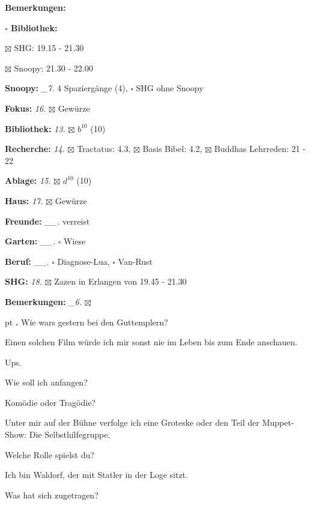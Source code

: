 \documentclass[10pt,a4paper]{article}
\newcounter{notec}
\newcommand\notep[1]{%
  \stepcounter{notec}
  \vskip #1pt
  {\bf\arabic{notec}.}
}
\newcommand\prop[1] {{\color {alizarin} {\bf #1}}}        %
\newcommand\mand[1] {{\color {burntorange} {\bf #1}}}     %
\newcommand\bottomspace{\vskip 4pt}
\newcommand\n[1] { {\sl #1.} \hskip 5pt }
\begin{document}
\begin{mdframed}[style=daystyle]
\begin{labeling}{{\mand {Bemerkungen:}}}
\begin{minipage}{0.75\textwidth}
\begin{labeling}{\prop {$\square$ {Bibliothek:}}}
      \item[$\boxtimes$ SHG:]        19.15 - 21.30
      \item[$\boxtimes$ Snoopy:]     21.30 - 22.00
      \end{labeling}
    \end{minipage}
    \bottomspace
  \item[{\mand {Snoopy:}}]        \n{\_7} 4 Spaziergänge (4), $\square$ SHG ohne Snoopy
  \item[{\mand {Fokus:}}]          \n{16} $\boxtimes$ Gewürze
  \item[{\mand {Bibliothek:}}]     \n{13} $\boxtimes$ $b^{10}$ (10)
  \item[{\mand {Recherche:}}]      \n{14} $\boxtimes$ Tractatus: 4.3, $\boxtimes$ Basis Bibel: 4.2,
      $\boxtimes$ Buddhas Lehrreden: 21 - 22
  \item[{\mand {Ablage:}}]         \n{15} $\boxtimes$ $d^{10}$ (10)
  \item[{\mand {Haus:}}]           \n{17} $\boxtimes$ Gewürze
  \item[{\mand {Freunde:}}]      \n{\_\_} verreist
  \item[{\mand {Garten:}}]       \n{\_\_} $\square$ Wiese
  \item[{\mand {Beruf:}}]        \n{\_\_} $\square$ Diagnose-Lua, $\square$ Van-Rust
  \item[{\mand {SHG:}}]            \n{18} $\boxtimes$ Zazen in Erlangen von 19.45 - 21.30
  \item[{\mand {Bemerkungen:}}]   \n{\_6} $\boxtimes$
  \end{labeling}
    
  \setcounter{notec}{0}
  
  \notep 0 Wie wars gestern bei den Guttemplern?

  \vskip 2pt
  Einen solchen Film würde ich mir sonst nie im Leben bis zum Ende anschauen.

  \vskip 2pt
  Ups.

  \vskip 2pt
  Wie soll ich anfangen?

  \vskip 2pt
  Komödie oder Tragödie?

  \vskip 2pt
  Unter mir auf der Bühne verfolge ich eine Groteske oder den Teil der
  Muppet-Show: Die Selbsthilfegruppe.

  \vskip 2pt
  Welche Rolle spielst du?

  \vskip 2pt
  Ich bin Waldorf, der mit Statler in der Loge sitzt.

  \vskip 2pt
  Was hat sich zugetragen?


\end{mdframed}
\end{document}
